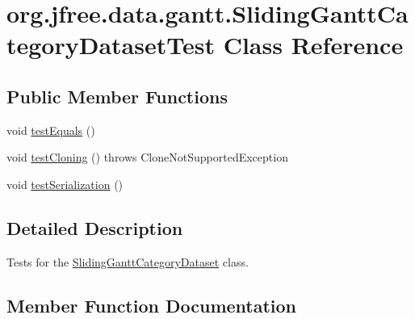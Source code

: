 \hypertarget{classorg_1_1jfree_1_1data_1_1gantt_1_1_sliding_gantt_category_dataset_test}{}\section{org.\+jfree.\+data.\+gantt.\+Sliding\+Gantt\+Category\+Dataset\+Test Class Reference}
\label{classorg_1_1jfree_1_1data_1_1gantt_1_1_sliding_gantt_category_dataset_test}
\subsection*{Public Member Functions}
\begin{DoxyCompactItemize}
\item 
void \mbox{\hyperlink{classorg_1_1jfree_1_1data_1_1gantt_1_1_sliding_gantt_category_dataset_test_acabbf3bdc81b2ec499c1cc5aaa9b4056}{test\+Equals}} ()
\item 
void \mbox{\hyperlink{classorg_1_1jfree_1_1data_1_1gantt_1_1_sliding_gantt_category_dataset_test_a7736fa46701d42e3d123e8939be904e9}{test\+Cloning}} ()  throws Clone\+Not\+Supported\+Exception 
\item 
void \mbox{\hyperlink{classorg_1_1jfree_1_1data_1_1gantt_1_1_sliding_gantt_category_dataset_test_a85f4f1f5371363152a3962246f0bd382}{test\+Serialization}} ()
\end{DoxyCompactItemize}


\subsection{Detailed Description}
Tests for the \mbox{\hyperlink{classorg_1_1jfree_1_1data_1_1gantt_1_1_sliding_gantt_category_dataset}{Sliding\+Gantt\+Category\+Dataset}} class. 

\subsection{Member Function Documentation}
\mbox{\label{classorg_1_1jfree_1_1data_1_1gantt_1_1_sliding_gantt_category_dataset_test_a7736fa46701d42e3d123e8939be904e9}} 

